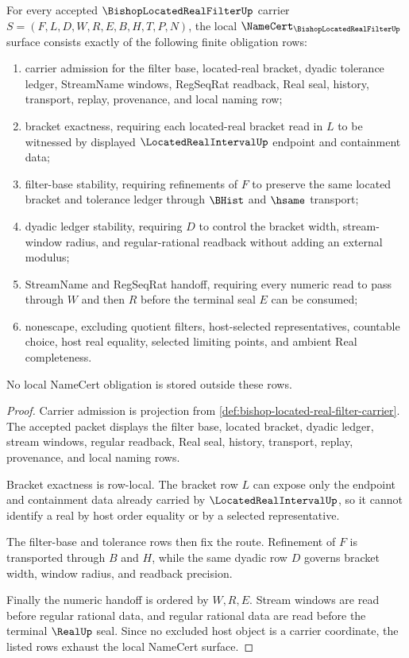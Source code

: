 \begin{theorem}
\label{thm:bishop-located-real-filter-namecert-obligations}
For every accepted $\BishopLocatedRealFilterUp$ carrier $S=(F,L,D,W,R,E,B,H,T,P,N)$, the local $\NameCert_{\BishopLocatedRealFilterUp}$ surface consists exactly of the following finite obligation rows:
\begin{enumerate}
\item carrier admission for the filter base, located-real bracket, dyadic tolerance ledger, StreamName windows, RegSeqRat readback, Real seal, history, transport, replay, provenance, and local naming row;
\item bracket exactness, requiring each located-real bracket read in $L$ to be witnessed by displayed $\LocatedRealIntervalUp$ endpoint and containment data;
\item filter-base stability, requiring refinements of $F$ to preserve the same located bracket and tolerance ledger through $\BHist$ and $\hsame$ transport;
\item dyadic ledger stability, requiring $D$ to control the bracket width, stream-window radius, and regular-rational readback without adding an external modulus;
\item StreamName and RegSeqRat handoff, requiring every numeric read to pass through $W$ and then $R$ before the terminal seal $E$ can be consumed;
\item nonescape, excluding quotient filters, host-selected representatives, countable choice, host real equality, selected limiting points, and ambient Real completeness.
\end{enumerate}
No local NameCert obligation is stored outside these rows.
\end{theorem}
\begin{proof}
Carrier admission is projection from \autoref{def:bishop-located-real-filter-carrier}. The accepted packet displays the filter base, located bracket, dyadic ledger, stream windows, regular readback, Real seal, history, transport, replay, provenance, and local naming rows.

Bracket exactness is row-local. The bracket row $L$ can expose only the endpoint and containment data already carried by $\LocatedRealIntervalUp$, so it cannot identify a real by host order equality or by a selected representative.

The filter-base and tolerance rows then fix the route. Refinement of $F$ is transported through $B$ and $H$, while the same dyadic row $D$ governs bracket width, window radius, and readback precision.

Finally the numeric handoff is ordered by $W,R,E$. Stream windows are read before regular rational data, and regular rational data are read before the terminal $\RealUp$ seal. Since no excluded host object is a carrier coordinate, the listed rows exhaust the local NameCert surface.
\end{proof}

